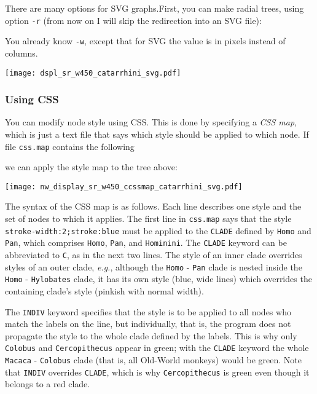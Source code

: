 \documentclass[a4paper,10pt]{report}
\newcommand{\svg}{\textsc{SVG}}
\newcommand{\css}{\textsc{CSS}}
\theoremstyle{definition}
\theoremstyle{definition}
\begin{document}
There are many options for \svg{} graphs.First, you can make radial trees, using option \texttt{-r} (from now on I will skip the redirection into an \svg{} file):



You already know \texttt{-w}, except that for \svg{} the value is in pixels instead of columns. 

\begin{center}
\texttt{[image: dspl\_sr\_w450\_catarrhini\_svg.pdf]}
\end{center}

\subsubsection{Using \css}
\label{sct_display_svg_css}

You can modify node style using \css. This is done by specifying a \textit{\css{} map}, which is just a text file that says which style should be applied to which node. If file \texttt{css.map} contains the following
\begin{quote}
 
\end{quote} 
we can apply the style map to the tree above:



\begin{center}
 \texttt{[image: nw\_display\_sr\_w450\_ccssmap\_catarrhini\_svg.pdf]}
\end{center}

The syntax of the \css{} map is as follows. Each line describes one style and the set of nodes to which it applies. The first line in \texttt{css.map} says that the style \texttt{stroke-width:2;stroke:blue} must be applied to the \texttt{CLADE} defined by \texttt{Homo} and \texttt{Pan}, which comprises \texttt{Homo}, \texttt{Pan}, and \texttt{Hominini}. The \texttt{CLADE} keyword can be abbreviated to \texttt{C}, as in the next two lines. The style of an inner clade overrides styles of an outer clade, \textit{e.g.}, although the \texttt{Homo} - \texttt{Pan} clade is nested inside the \texttt{Homo} - \texttt{Hylobates} clade, it has its own style (blue, wide lines) which overrides the containing clade's style (pinkish with normal width).

The \texttt{INDIV} keyword specifies that the style is to be applied to all nodes who match the labels on the line, but individually, that is, the program does not propagate the style to the whole clade defined by the labels. This is why only \texttt{Colobus} and \texttt{Cercopithecus} appear in green; with the \texttt{CLADE} keyword the whole \texttt{Macaca} - \texttt{Colobus} clade (that is, all Old-World monkeys) would be green. Note that \texttt{INDIV} overrides \texttt{CLADE}, which is why \texttt{Cercopithecus} is green even though it belongs to a red clade.
\end{document}
